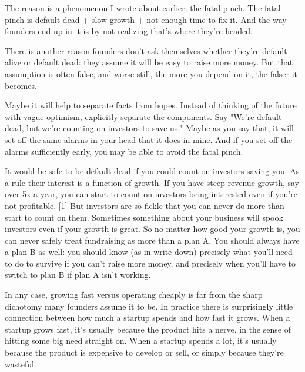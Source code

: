The reason is
                  a phenomenon I wrote about earlier: the
                  \href{http://www.paulgraham.com/pinch.html}{fatal pinch}. The fatal pinch is
                  default dead + slow growth + not enough time to fix it. And
                  the way founders end up in it is by not realizing that's where
                  they're headed.

There is another reason founders
                  don't ask themselves whether they're default alive or default
                  dead: they assume it will be easy to raise more money. But
                  that assumption is often false, and worse still, the more you
                  depend on it, the falser it becomes.

Maybe it will
                  help to separate facts from hopes. Instead of thinking of the
                  future with vague optimism, explicitly separate the
                  components. Say "We're default dead, but we're counting on
                  investors to save us." Maybe as you say that, it will set off
                  the same alarms in your head that it does in mine. And if you
                  set off the alarms sufficiently early, you may be able to
                  avoid the fatal pinch.

It would be safe to be
                  default dead if you could count on investors saving you. As a
                  rule their interest is a function of growth. If you have steep
                  revenue growth, say over 5x a year, you can start to count on
                  investors being interested even if you're not profitable.
                  [\href{\#f1n}{1}]
                  But investors are so fickle that you can never do more than
                  start to count on them. Sometimes something about your
                  business will spook investors even if your growth is great. So
                  no matter how good your growth is, you can never safely treat
                  fundraising as more than a plan A. You should always have a
                  plan B as well: you should know (as in write down) precisely
                  what you'll need to do to survive if you can't raise more
                  money, and precisely when you'll have to switch to plan B if
                  plan A isn't working.

In any case, growing fast
                  versus operating cheaply is far from the sharp dichotomy many
                  founders assume it to be. In practice there is surprisingly
                  little connection between how much a startup spends and how
                  fast it grows. When a startup grows fast, it's usually because
                  the product hits a nerve, in the sense of hitting some big
                  need straight on. When a startup spends a lot, it's usually
                  because the product is expensive to develop or sell, or simply
                  because they're wasteful.


